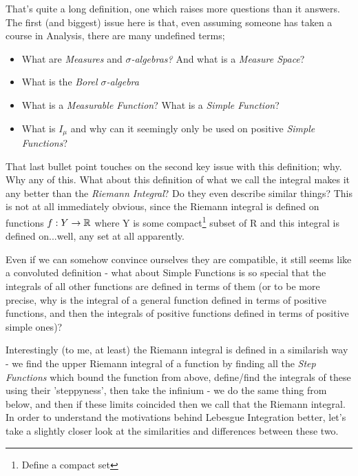 That's quite a long definition, one which raises more questions than it answers. The first (and biggest) issue here is that, even assuming someone has taken a course in Analysis, there are many undefined terms;
\begin{itemize}
	\item What are {\em Measures} and {\em $\sigma$-algebras?} And what is a {\em Measure Space}?
	\item What is the {\em Borel $\sigma$-algebra}
	\item What is a {\em Measurable Function\/}? What is a {\em Simple Function}?
	\item What is $I_\mu$ and why can it seemingly only be used on positive {\em Simple Functions}?
\end{itemize}

That last bullet point touches on the second key issue with this definition; why. Why any of this. What about this definition of what we call the integral makes it any better than the {\em Riemann Integral}? Do they even describe similar things? This is not at all immediately obvious, since the Riemann integral is defined on functions $f: Y \rightarrow \mathbb{R}$ where Y is some compact\footnote{Define a compact set} subset of R and this integral is defined on...well, any set at all apparently.

Even if we can somehow convince ourselves they are compatible, it still seems like a convoluted definition - what about Simple Functions is so special that the integrals of all other functions are defined in terms of them (or to be more precise, why is the integral of a general function defined in terms of positive functions, and then the integrals of positive functions defined in terms of positive simple ones)?

Interestingly (to me, at least) the Riemann integral is defined in a similarish way - we find the upper Riemann integral of a function by finding all the {\em Step Functions} which bound the function from above, define/find the integrals of these using their 'steppyness', then take the infinium - we do the same thing from below, and then if these limits coincided then we call that the Riemann integral. In order to understand the motivations behind Lebesgue Integration better, let's take a slightly closer look at the similarities and differences between these two.
